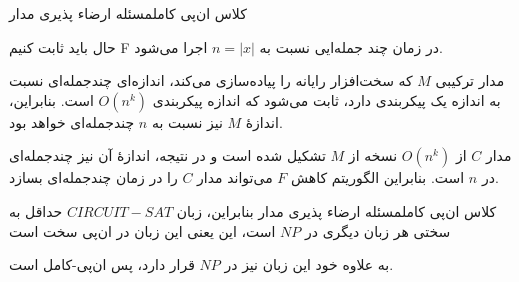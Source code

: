 \begin{itemframe-s}{کلاس ان‌پی کامل}{مسئله ارضاء پذیری مدار}

\itm
حال باید ثابت کنیم F در زمان چند جمله‌ایی نسبت به
$n = |x|$
اجرا می‌شود.

\itm
مدار ترکیبی $M$ که سخت‌افزار رایانه را پیاده‌سازی می‌کند، اندازه‌ای چندجمله‌ای نسبت به اندازه یک پیکربندی دارد، ثابت می‌شود که اندازه پیکربندی
$O(n^k)$
است. بنابراین، اندازهٔ $M$ نیز نسبت به $n$ چندجمله‌ای خواهد بود.

\itm
مدار $C$ از
$O(n^k)$
نسخه از $M$ تشکیل شده است و در نتیجه، اندازهٔ آن نیز چندجمله‌ای در $n$ است.
بنابراین الگوریتم کاهش $F$ می‌تواند مدار $C$ را در زمان چندجمله‌ای بسازد.

\end{itemframe-s}

\begin{itemframe-s}{کلاس ان‌پی کامل}{مسئله ارضاء پذیری مدار}
\itm
بنابراین، زبان $CIRCUIT-SAT$ حداقل به سختی هر زبان دیگری در $NP$ است، این یعنی این زبان در ان‌پی سخت است

\itm
به علاوه خود این زبان نیز در
$NP$
قرار دارد، پس ان‌پی‌-کامل است.

\end{itemframe-s}
